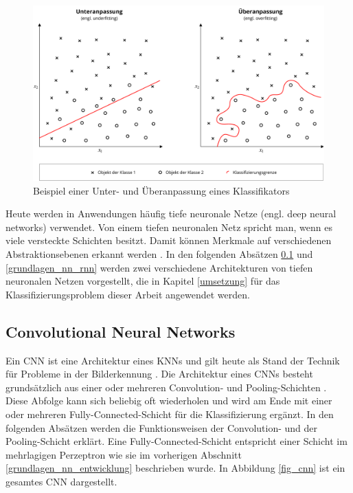 \begin{figure}[h]
\centering
\includegraphics[scale=0.4]{images/overfitting.pdf}
\caption{Beispiel einer Unter- und Überanpassung eines Klassifikators}
\label{fig_overfitting}
\end{figure}

Heute werden in Anwendungen häufig tiefe neuronale Netze (engl. deep neural networks) verwendet. Von einem tiefen neuronalen Netz spricht man, wenn es viele versteckte Schichten besitzt. Damit können Merkmale auf verschiedenen Abstraktionsebenen erkannt werden \cite{lecun2015deep}. In den folgenden Absätzen \ref{grundlagen_nn_cnn} und \ref{grundlagen_nn_rnn} werden zwei verschiedene Architekturen von tiefen neuronalen Netzen vorgestellt, die in Kapitel \ref{umsetzung} für das Klassifizierungsproblem dieser Arbeit angewendet werden.


\subsection{Convolutional Neural Networks}
\label{grundlagen_nn_cnn}

Ein \acf{CNN} ist eine Architektur eines \acp{KNN} und gilt heute als Stand der Technik für Probleme in der Bilderkennung \cite{krizhevsky2012imagenet}. Die Architektur eines \acp{CNN} besteht grundsätzlich aus einer oder mehreren Convolution- und Pooling-Schichten \cite{lecun2010convolutional}. Diese Abfolge kann sich beliebig oft wiederholen und wird am Ende mit einer oder mehreren Fully-Connected-Schicht für die Klassifizierung ergänzt. In den folgenden Absätzen werden die Funktionsweisen der Convolution- und der Pooling-Schicht erklärt. Eine Fully-Connected-Schicht entspricht einer Schicht im mehrlagigen Perzeptron wie sie im vorherigen Abschnitt \ref{grundlagen_nn_entwicklung} beschrieben wurde. In Abbildung \ref{fig_cnn} ist ein gesamtes \ac{CNN} dargestellt.

